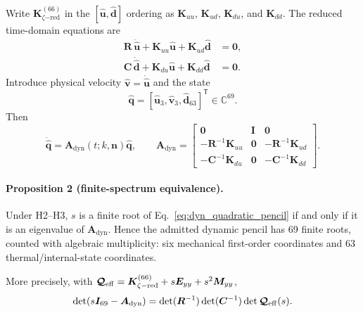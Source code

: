 Write $\boldsymbol K_{\zeta\mathrm{-red}}^{(66)}$ in the
$[\widehat{\boldsymbol u},\widehat{\boldsymbol d}]$ ordering as
$\boldsymbol K_{uu}$, $\boldsymbol K_{ud}$,
$\boldsymbol K_{du}$, and $\boldsymbol K_{dd}$.  The reduced time-domain
equations are
\begin{align}
 \boldsymbol R\,\ddot{\widehat{\boldsymbol u}}
 +\boldsymbol K_{uu}\widehat{\boldsymbol u}
 +\boldsymbol K_{ud}\widehat{\boldsymbol d}&=\boldsymbol0,
 \label{eq:dyn_reduced_momentum}\\
 \boldsymbol C\,\dot{\widehat{\boldsymbol d}}
 +\boldsymbol K_{du}\widehat{\boldsymbol u}
 +\boldsymbol K_{dd}\widehat{\boldsymbol d}&=\boldsymbol0.
 \label{eq:dyn_reduced_storage}
\end{align}
Introduce physical velocity
$\widehat{\boldsymbol v}=\dot{\widehat{\boldsymbol u}}$ and the state
\begin{equation}
 \widehat{\boldsymbol q}
 =
 [\widehat{\boldsymbol u}_3,
  \widehat{\boldsymbol v}_3,
  \widehat{\boldsymbol d}_{63}]^{\mathsf T}\in\mathbb C^{69}.
 \label{eq:dyn_generator_state}
\end{equation}
Then
\begin{equation}
 \dot{\widehat{\boldsymbol q}}
 =\boldsymbol A_{\mathrm{dyn}}(t;k,\boldsymbol n)
  \widehat{\boldsymbol q},
 \qquad
 \boldsymbol A_{\mathrm{dyn}}
 =
 \begin{bmatrix}
  \boldsymbol0&\boldsymbol I&\boldsymbol0\\
  -\boldsymbol R^{-1}\boldsymbol K_{uu}&\boldsymbol0&
  -\boldsymbol R^{-1}\boldsymbol K_{ud}\\
  -\boldsymbol C^{-1}\boldsymbol K_{du}&\boldsymbol0&
  -\boldsymbol C^{-1}\boldsymbol K_{dd}
 \end{bmatrix}.
 \label{eq:dyn_generator_matrix}
\end{equation}

\paragraph{Proposition 2 (finite-spectrum equivalence).}
Under H2--H3, $s$ is a finite root of
Eq.~\eqref{eq:dyn_quadratic_pencil} if and only if it is an eigenvalue of
$\boldsymbol A_{\mathrm{dyn}}$.  Hence the admitted dynamic pencil has 69
finite roots, counted with algebraic multiplicity: six mechanical first-order
coordinates and 63 thermal/internal-state coordinates.

More precisely, with
$\boldsymbol{\mathcal Q}_{\rm eff}=
\boldsymbol K_{\zeta\mathrm{-red}}^{(66)}
+s\boldsymbol E_{yy}+s^2\boldsymbol M_{yy}$,
\begin{equation}
 \det(s\boldsymbol I_{69}-\boldsymbol A_{\rm dyn})
 =\det(\boldsymbol R^{-1})\det(\boldsymbol C^{-1})
  \det\boldsymbol{\mathcal Q}_{\rm eff}(s).
 \label{eq:dyn_generator_determinant}
\end{equation}

